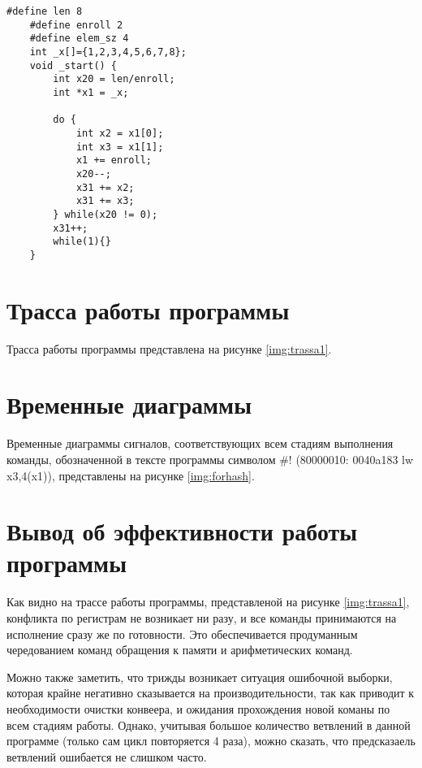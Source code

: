 \begin{lstlisting}[caption=Псевдокод исследуемой программы,
	label={list_psevdo2}]
	#define len 8
	#define enroll 2
	#define elem_sz 4
	int _x[]={1,2,3,4,5,6,7,8};
	void _start() {
		int x20 = len/enroll;
		int *x1 = _x;
		
		do {
			int x2 = x1[0];
			int x3 = x1[1];
			x1 += enroll;
			x20--;
			x31 += x2;
			x31 += x3;
		} while(x20 != 0);
		x31++;
		while(1){}
	}
\end{lstlisting}

\section*{Трасса работы программы}

Трасса работы программы представлена на рисунке \ref{img:trassa1}.

\clearpage
{}

\section*{Временные диаграммы}

Временные диаграммы сигналов, соответствующих всем стадиям выполнения команды, обозначенной в тексте программы символом \#! (80000010:	0040a183	lw x3,4(x1)), представлены на рисунке \ref{img:forhash}.

\clearpage
{}


\section*{Вывод об эффективности работы программы}

Как видно на трассе работы программы, представленой на рисунке \ref{img:trassa1}, конфликта по регистрам не возникает ни разу, и все команды принимаются на исполнение сразу же по готовности. Это обеспечивается продуманным чередованием команд обращения к памяти и арифметических команд.

Можно также заметить, что трижды возникает ситуация ошибочной выборки, которая крайне негативно сказывается на производительности, так как приводит к необходимости очистки конвеера, и ожидания прохождения новой команы по всем стадиям работы. Однако, учитывая большое количество ветвлений в данной программе (только сам цикл повторяется 4 раза), можно сказать, что предсказаель ветвлений ошибается не слишком часто.

